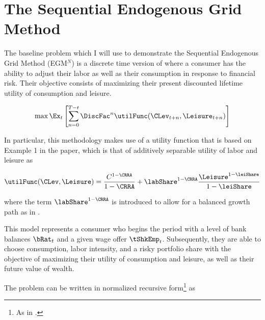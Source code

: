 \documentclass[\econtexRoot/EGMN]{subfiles}
\begin{document}
\notinsubfile{\renewcommand{\econtexRoot}{.}}

\hypertarget{model}{}\par\section{The Sequential Endogenous Grid Method}
\notinsubfile{\label{sec:model}}


The baseline problem which I will use to demonstrate the Sequential Endogenous Grid Method (EGM$^N$) is a discrete time version of \cite{Bodie1992-yp} where a consumer has the ability to adjust their labor as well as their consumption in response to financial risk. Their objective consists of maximizing their present discounted lifetime utility of consumption and leisure.

\begin{equation}
    \max \Ex_{t} \left[ \sum_{n = 0}^{T-t} \DiscFac^{n} \utilFunc(\CLev_{t+n}, \Leisure_{t+n})  \right]
\end{equation}

In particular, this methodology makes use of a utility function that is based on Example 1 in the paper, which is that of additively separable utility of labor and leisure as

\begin{equation}
    \utilFunc(\CLev, \Leisure) = \frac{C^{1-\CRRA}}{1-\CRRA} + \labShare^{1-\CRRA} \frac{\Leisure^{1-\leiShare}}{1-\leiShare}
\end{equation}

where the term $\labShare^{1-\CRRA}$ is introduced to allow for a balanced growth path as in \cite{Mertens2011-ap}.

This model represents a consumer who begins the period with a level of bank balances $\bRat_{t}$ and a given wage offer $\tShkEmp_{t}$. Subsequently, they are able to choose consumption, labor intensity, and a risky portfolio share with the objective of maximizing their utility of consumption and leisure, as well as their future value of wealth.

The problem can be written in normalized recursive form\footnote{As in \cite{Carroll2009-zq}.} as
\end{document}
